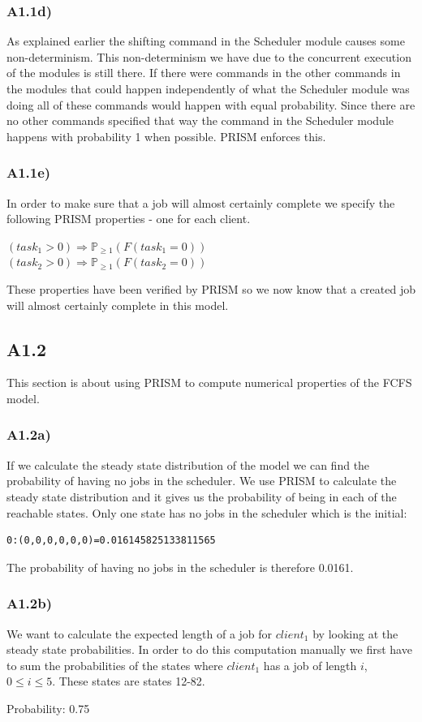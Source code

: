 \documentclass[12pt]{report}
\begin{document}
\subsubsection*{A1.1d)}
As explained earlier the shifting command in the Scheduler module causes some non-determinism. This non-determinism we have due to the concurrent execution of the modules is still there. If there were commands in the other commands in the modules that could happen independently of what the Scheduler module was doing all of these commands would happen with equal probability. Since there are no other commands specified that way the command in the Scheduler module happens with probability 1 when possible. PRISM enforces this.

\subsubsection*{A1.1e)}
In order to make sure that a job will almost certainly complete we specify the following PRISM properties - one for each client.
\begin{center}
$(task_1 > 0) \Rightarrow \mathbb{P}_{\geq 1}(F(task_1 = 0))$\\
$(task_2 > 0) \Rightarrow \mathbb{P}_{\geq 1}(F(task_2 = 0))$
\end{center}
These properties have been verified by PRISM so we now know that a created job will almost certainly complete in this model.

\subsection*{A1.2}
This section is about using PRISM to compute numerical properties of the FCFS model.

\subsubsection*{A1.2a)}
If we calculate the steady state distribution of the model we can find the probability of having no jobs in the scheduler. We use PRISM to calculate the steady state distribution and it gives us the probability of being in each of the reachable states. Only one state has no jobs in the scheduler which is the initial:
\begin{lstlisting}[style=logoutput]
0:(0,0,0,0,0,0)=0.016145825133811565
\end{lstlisting}
The probability of having no jobs in the scheduler is therefore 0.0161.

\subsubsection*{A1.2b)}
We want to calculate the expected length of a job for $client_1$ by looking at the steady state probabilities. In order to do this computation manually we first have to sum the probabilities of the states where $client_1$ has a job of length $i$, $0 \leq i \leq 5$. These states are states 12-82.
\begin{center}
Probability: 0.75
\end{center}
\end{document}
